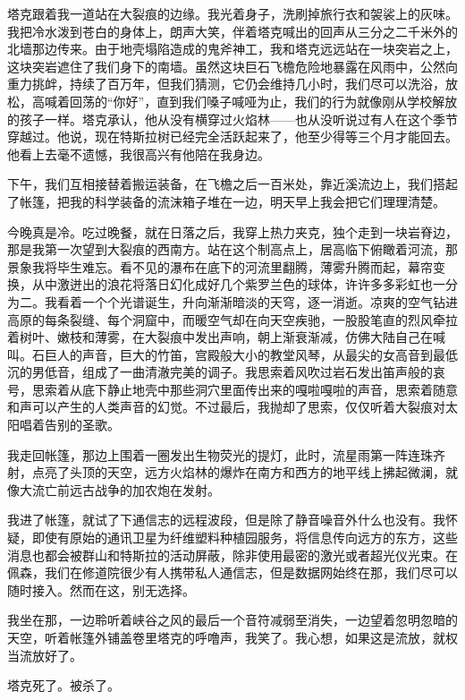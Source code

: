 \documentclass[AutoFakeBold=true]{book}
\begin{document}
塔克跟着我一道站在大裂痕的边缘。我光着身子，洗刷掉旅行衣和袈裟上的灰味。我把冷水泼到苍白的身体上，朗声大笑，伴着塔克喊出的回声从三分之二千米外的北墙那边传来。由于地壳塌陷造成的鬼斧神工，我和塔克远远站在一块突岩之上，这块突岩遮住了我们身下的南墙。虽然这块巨石飞檐危险地暴露在风雨中，公然向重力挑衅，持续了百万年，但我们猜测，它仍会维持几小时，我们尽可以洗浴，放松，高喊着回荡的``你好''，直到我们嗓子喊哑为止，我们的行为就像刚从学校解放的孩子一样。塔克承认，他从没有横穿过火焰林——也从没听说过有人在这个季节穿越过。他说，现在特斯拉树已经完全活跃起来了，他至少得等三个月才能回去。他看上去毫不遗憾，我很高兴有他陪在我身边。

下午，我们互相接替着搬运装备，在飞檐之后一百米处，靠近溪流边上，我们搭起了帐篷，把我的科学装备的流沫箱子堆在一边，明天早上我会把它们理理清楚。

今晚真是冷。吃过晚餐，就在日落之后，我穿上热力夹克，独个走到一块岩脊边，那是我第一次望到大裂痕的西南方。站在这个制高点上，居高临下俯瞰着河流，那景象我将毕生难忘。看不见的瀑布在底下的河流里翻腾，薄雾升腾而起，幕帘变换，从中激迸出的浪花将落日幻化成好几个紫罗兰色的球体，许许多多彩虹也一分为二。我看着一个个光谱诞生，升向渐渐暗淡的天穹，逐一消逝。凉爽的空气钻进高原的每条裂缝、每个洞窟中，而暖空气却在向天空疾驰，一股股笔直的烈风牵拉着树叶、嫩枝和薄雾，在大裂痕中发出声响，朝上渐衰渐减，仿佛大陆自己在喊叫。石巨人的声音，巨大的竹笛，宫殿般大小的教堂风琴，从最尖的女高音到最低沉的男低音，组成了一曲清澈完美的调子。我思索着风吹过岩石发出笛声般的哀号，思索着从底下静止地壳中那些洞穴里面传出来的嘎啦嘎啦的声音，思索着随意和声可以产生的人类声音的幻觉。不过最后，我抛却了思索，仅仅听着大裂痕对太阳唱着告别的圣歌。

我走回帐篷，那边上围着一圈发出生物荧光的提灯，此时，流星雨第一阵连珠齐射，点亮了头顶的天空，远方火焰林的爆炸在南方和西方的地平线上拂起微澜，就像大流亡前远古战争的加农炮在发射。

我进了帐篷，就试了下通信志的远程波段，但是除了静音噪音外什么也没有。我怀疑，即使有原始的通讯卫星为纤维塑料种植园服务，将信息传向远方的东方，这些消息也都会被群山和特斯拉的活动屏蔽，除非使用最密的激光或者超光仪光束。在佩森，我们在修道院很少有人携带私人通信志，但是数据网始终在那，我们尽可以随时接入。然而在这，别无选择。

我坐在那，一边聆听着峡谷之风的最后一个音符减弱至消失，一边望着忽明忽暗的天空，听着帐篷外铺盖卷里塔克的呼噜声，我笑了。我心想，如果这是流放，就权当流放好了。

\vspace*{1em}{\kaishu 第八十八日：}

塔克死了。被杀了。
\end{document}
